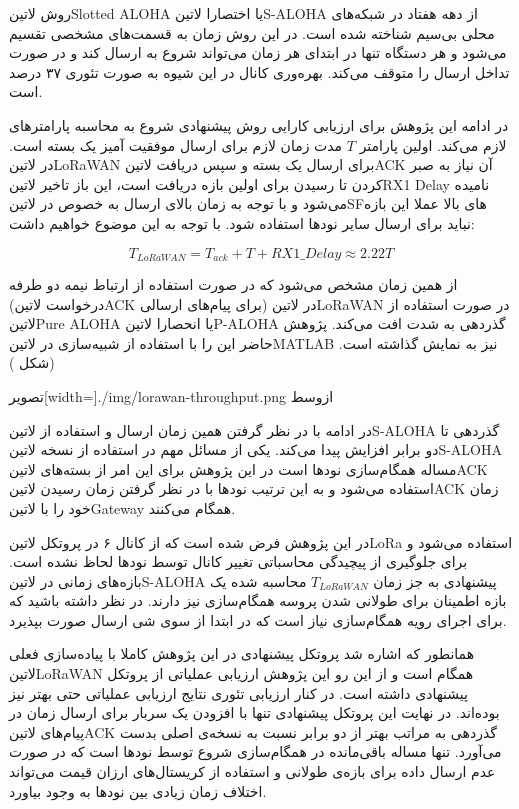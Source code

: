 روش ‌لاتین{Slotted ALOHA} یا اختصارا ‌لاتین{S-ALOHA} از دهه هفتاد در شبکه‌های محلی بی‌سیم شناخته شده است. در این روش زمان به قسمت‌های مشخصی تقسیم می‌شود
و هر دستگاه تنها در ابتدای هر زمان می‌تواند شروع به ارسال کند و در صورت تداخل ارسال را متوقف می‌کند. بهره‌وری کانال در این شیوه به صورت تئوری ۳۷ درصد است.

در ادامه این پژوهش برای ارزیابی کارایی روش پیشنهادی شروع به محاسبه پارامترهای لازم می‌کند. اولین پارامتر $T$ مدت زمان لازم برای ارسال موفقیت آمیز یک بسته است. در ‌لاتین{LoRaWAN}
برای ارسال یک بسته و سپس دریافت ‌لاتین{ACK} آن نیاز به صبر کردن تا رسیدن برای اولین بازه دریافت است، این باز تاخیر ‌لاتین{RX1 Delay} نامیده می‌شود و با توجه به زمان بالای ارسال
به خصوص در ‌لاتین{SF}های بالا عملا این بازه نباید برای ارسال سایر نودها استفاده شود. با توجه به این موضوع خواهیم داشت:

\[
  T_{LoRaWAN} = T_{ack} + T + RX1\_Delay \approx 2.22T
\]

از همین زمان مشخص می‌شود که در صورت استفاده از ارتباط نیمه دو طرفه (درخواست ‌لاتین{ACK} برای پیام‌های ارسالی) در ‌لاتین{LoRaWAN} در صورت استفاده از ‌لاتین{Pure ALOHA}
یا انحصارا ‌لاتین{P-ALOHA} گذردهی به شدت افت می‌کند. پژوهش حاضر این را با استفاده از شبیه‌سازی در ‌لاتین{MATLAB} نیز به نمایش گذاشته است.(شکل )

‌تصویر[width=\textwidth]{./img/lorawan-throughput.png}
‌ازوسط

در ادامه با در نظر گرفتن همین زمان ارسال و استفاده از ‌لاتین{S-ALOHA} گذردهی تا دو برابر افزایش پیدا می‌کند. یکی از مسائل مهم در استفاده از نسخه ‌لاتین{S-ALOHA} مساله همگام‌سازی نودها است
در این پژوهش برای این امر از بسته‌های ‌لاتین{ACK} استفاده می‌شود و به این ترتیب نودها با در نظر گرفتن زمان رسیدن ‌لاتین{ACK} زمان خود را با ‌لاتین{Gateway} همگام می‌کنند.

در این پژوهش فرض شده است که از کانال ۶ در پروتکل ‌لاتین{LoRa} استفاده می‌شود و برای جلوگیری از پیچیدگی محاسباتی تغییر کانال توسط نودها لحاظ نشده است. بازه‌های زمانی در ‌لاتین{S-ALOHA}
پیشنهادی به جز زمان $T_{LoRaWAN}$ محاسبه شده یک بازه اطمینان برای طولانی شدن پروسه همگام‌سازی نیز دارند. در نظر داشته باشید که برای اجرای رویه همگام‌سازی نیاز است که در ابتدا از سوی شی ارسال
صورت بپذیرد.

همانطور که اشاره شد پروتکل پیشنهادی در این پژوهش کاملا با پیاده‌سازی فعلی ‌لاتین{LoRaWAN} همگام است و از این رو این پژوهش ارزیابی عملیاتی از پروتکل پیشنهادی داشته است.
در کنار ارزیابی تئوری نتایج ارزیابی عملیاتی حتی بهتر نیز بوده‌اند. در نهایت این پروتکل پیشنهادی تنها با افزودن یک سربار برای ارسال زمان در پیام‌های ‌لاتین{ACK} گذردهی به مراتب بهتر از دو برابر
نسبت به نسخه‌ی اصلی بدست می‌آورد. تنها مساله باقی‌مانده در همگام‌سازی شروع توسط نودها است که در صورت عدم ارسال داده برای بازه‌ی طولانی و استفاده از کریستال‌های ارزان قیمت می‌تواند
اختلاف زمان زیادی بین نودها به وجود بیاورد.

